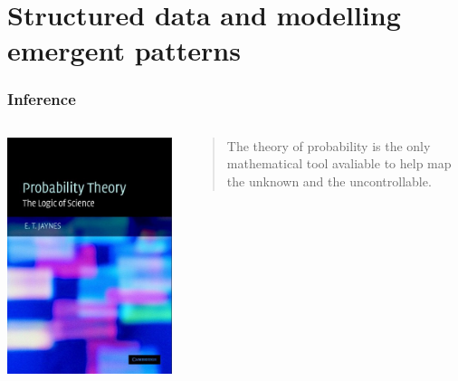 \documentclass{beamer}
\begin{document}
\section{Structured data and modelling emergent patterns}

\begin{frame}
  \frametitle{Inference}
  \begin{columns}
    \begin{column}{0.45\textwidth}
      \begin{center}
        \includegraphics[width = \textwidth,height = 0.8\textheight,keepaspectratio = true]{figure/jaynes_theory}
      \end{center}
    \end{column}
    \begin{column}{0.55\textwidth}
      \begin{quote}
        The theory of probability is the only mathematical tool avaliable to help map the unknown and the uncontrollable.
      \end{quote}
      \footnotesize{}
    \end{column}
  \end{columns}
\end{frame}
\end{document}
